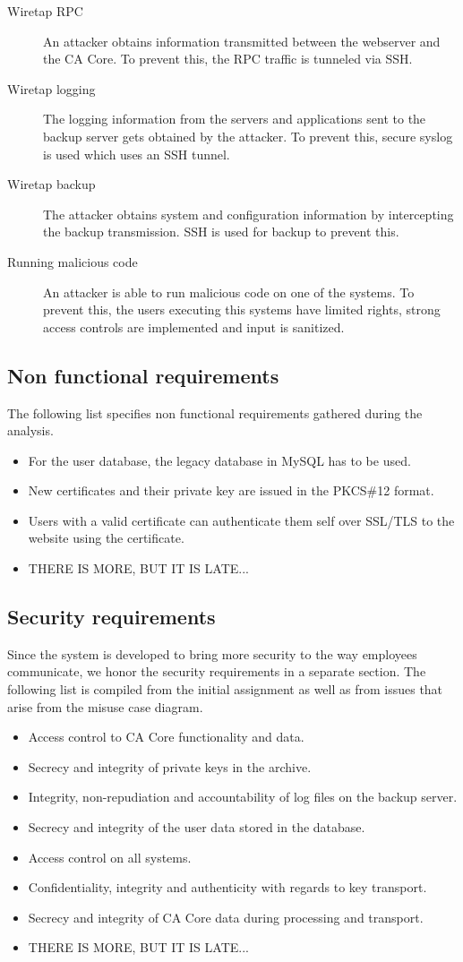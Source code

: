 \documentclass[a4paper, toc=index, 12pt, DIV14, twoside, BCOR2cm, headsepline, numbers=noenddot, bibliography=totoc]{scrbook}
\begin{document}
\begin{description}
\item[Wiretap RPC ] An attacker obtains information transmitted between the webserver and the CA Core. To prevent this, the RPC traffic is tunneled via SSH.
\item[Wiretap logging ] The logging information from the servers and applications sent to the backup server gets obtained by the attacker. To prevent this, secure syslog is used which uses an SSH tunnel.
\item[Wiretap backup ] The attacker obtains system and configuration information by intercepting the backup transmission. SSH is used for backup to prevent this.
\item[Running malicious code ] An attacker is able to run malicious code on one of the systems. To prevent this, the users executing this systems have limited rights, strong access controls are implemented and input is sanitized.
\end{description}


\subsection{Non functional requirements}
The following list specifies non functional requirements gathered during the analysis.
\begin{itemize}
\item For the user database, the legacy database in MySQL has to be used.
\item New certificates and their private key are issued in the PKCS\#12 format.
\item Users with a valid certificate can authenticate them self over SSL/TLS to the website using the certificate. 
\item THERE IS MORE, BUT IT IS LATE...
\end{itemize}

\subsection{Security requirements}
Since the system is developed to bring more security to the way employees communicate, we honor the security requirements in a separate section. The following list is compiled from the initial assignment as well as from issues that arise from the misuse case diagram.
\begin{itemize}
\item Access control to CA Core functionality and data.
\item Secrecy and integrity of private keys in the archive.
\item Integrity, non-repudiation and accountability of log files on the backup server.
\item Secrecy and integrity of the user data stored in the database.
\item Access control on all systems.
\item Confidentiality, integrity and authenticity with regards to key transport.
\item Secrecy and integrity of CA Core data during processing and transport.
\item THERE IS MORE, BUT IT IS LATE...
\end{itemize}
\end{document}
